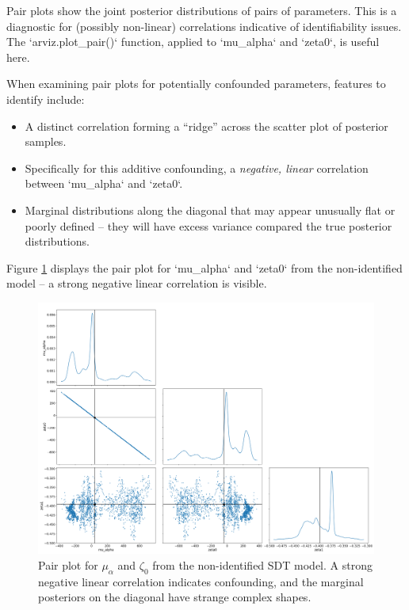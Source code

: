 \documentclass[12pt]{article}
\begin{document}
Pair plots show the joint posterior distributions of pairs of parameters. This is a diagnostic for (possibly non-linear) correlations indicative of identifiability issues. The `arviz.plot\_pair()` function, applied to `mu\_alpha` and `zeta0`, is useful here.

When examining pair plots for potentially confounded parameters, features to identify include:
\begin{itemize}[label=--, itemsep=1ex]
    \item A distinct correlation forming a ``ridge'' across the scatter plot of posterior samples.
    \item Specifically for this additive confounding, a \emph{negative, linear} correlation between `mu\_alpha` and `zeta0`.
    \item Marginal distributions along the diagonal that may appear unusually flat or poorly defined -- they will have excess variance compared the true posterior distributions.
\end{itemize}
Figure \ref{fig:nonid_pair} displays the pair plot for `mu\_alpha` and `zeta0` from the non-identified model --  a strong negative linear correlation is visible.

\begin{figure}[tbhp]
    \centering
    \includegraphics[width=\linewidth]{nonid_sdt_pair.png}
    \caption{Pair plot for $\mu_\alpha$ and $\zeta_0$ from the non-identified SDT model. A strong negative linear correlation indicates confounding, and the marginal posteriors on the diagonal have strange complex shapes.}
    \label{fig:nonid_pair}
\end{figure}
\end{document}
